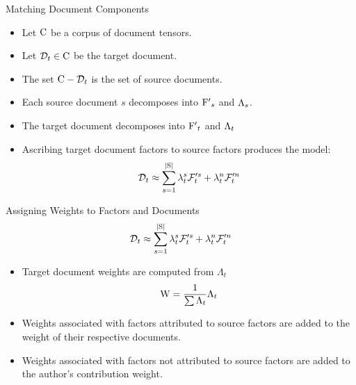 \documentclass[handout]{beamer}
\begin{document}
\begin{frame}{Matching Document Components}
  \begin{itemize}[<+->]
  \item Let $\mathrm{C}$ be a corpus of document tensors.
  \item Let $\mathcal{D}_t \in \mathrm{C}$ be the target document.
  \item The set $\mathrm{C}-\mathcal{D}_t$ is the set of source documents.
  \item Each source document $s$ decomposes into $\mathrm{F'}_s$  and
    $\mathrm{\Lambda}_s$.
  \item The target document decomposes into $\mathrm{F'}_t$ and
    $\mathrm{\Lambda}_t$
  \item Ascribing target document factors to source factors produces
    the model:
    \[
      \mathcal{D}_t \approx \sum_{s=1}^{|\mathrm{S}|} \lambda^s_t \mathcal{F}'^s_t +
  \lambda^n_t \mathcal{F}'^n_t
    \]
  \end{itemize}
\end{frame}


\begin{frame}{Assigning Weights to Factors and Documents}
  \[
      \mathcal{D}_t \approx \sum_{s=1}^{|\mathrm{S}|} \lambda^s_t \mathcal{F}'^s_t +
  \lambda^n_t \mathcal{F}'^n_t
\]

  \begin{itemize}[<+->]
  \item Target document weights are computed from $\Lambda_t$
    \[
      \mathrm{W} = \dfrac{1}{\sum \Lambda_t} \Lambda_t
    \]
  \item Weights associated with factors attributed to source factors
    are added to the weight of their respective documents.
  \item Weights associated with factors not attributed to source
    factors are added to the author's contribution weight.
  \end{itemize}
\end{frame}
\end{document}
